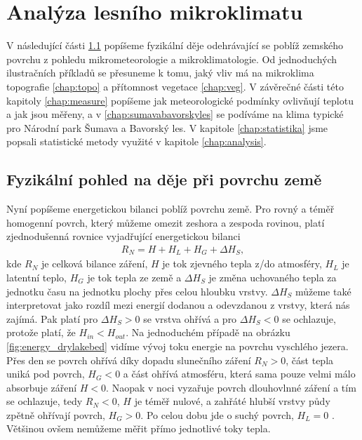 \chapter{Analýza lesního mikroklimatu}\label{chap:ch1}
V následující části \ref{chap:fyz} popíšeme fyzikální děje odehrávající se poblíž zemského povrchu z pohledu mikrometeorologie a mikroklimatologie. Od jednoduchých ilustračních příkladů se přesuneme k tomu, jaký vliv má na mikroklima topografie \ref{chap:topo} a přítomnost vegetace \ref{chap:veg}. V závěrečné části této kapitoly \ref{chap:measure} popíšeme jak meteorologické podmínky ovlivňují teplotu a jak jsou měřeny, a v \ref{chap:sumavabavorskyles} se podíváme na klima typické pro Národní park Šumava a Bavorský les. V kapitole \ref{chap:statistika} jsme popsali statistické metody využité v kapitole \ref{chap:analysis}.

\section{Fyzikální pohled na děje při povrchu země} \label{chap:fyz}
Nyní popíšeme energetickou bilanci poblíž povrchu země. Pro rovný a téměř homogenní povrch, který můžeme omezit zeshora a zespoda rovinou, platí zjednodušenná rovnice vyjadřující energetickou bilanci \parencite{arya2001}
\begin{gather}\label{eq:bilance}
R_N = H + H_L + H_G + \Delta H_S,
\end{gather}
kde $R_N$ je celková bilance záření, $H$ je tok zjevného tepla z/do atmosféry, $H_L$ je latentní teplo, $H_G$ je tok tepla ze země a $\Delta H_S$ je změna uchovaného tepla za jednotku času na jednotku plochy přes celou hloubku vrstvy. $\Delta H_S$ můžeme také interpretovat jako rozdíl mezi energií dodanou a odevzdanou z vrstvy, která nás zajímá. Pak platí pro $\Delta H_S>0$ se vrstva ohřívá a pro $\Delta H_S<0$ se ochlazuje, protože platí, že $H_{in}<H_{out}$. Na jednoduchém případě na obrázku \ref{fig:energy_drylakebed} vidíme vývoj toku energie na povrchu vyschlého jezera. Přes den se povrch ohřívá díky dopadu slunečního záření $R_N>0$, část tepla uniká pod povrch, $H_G<0$ a část ohřívá atmosféru, která sama pouze velmi málo absorbuje záření $H<0$. Naopak v noci vyzařuje povrch dlouhovlnné záření a tím se ochlazuje, tedy $R_N<0$, $H$ je téměř nulové, a zahřáté hlubší vrstvy půdy zpětně ohřívají povrch, $H_G>0$. Po celou dobu jde o suchý povrch, $H_L=0$ \parencite{arya2001}. Většinou ovšem nemůžeme měřit přímo jednotlivé toky tepla.

